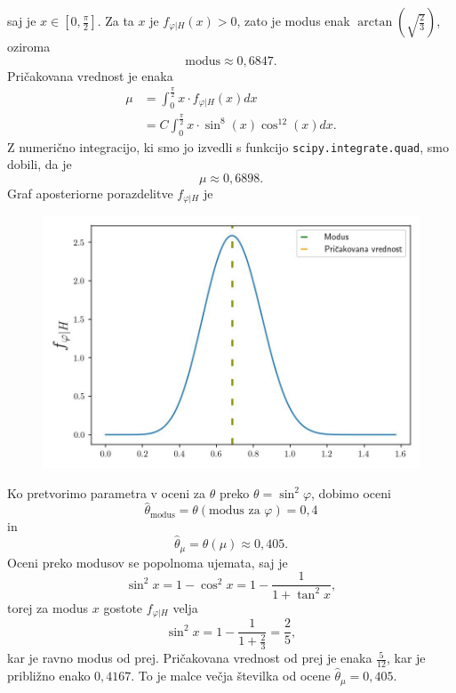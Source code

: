 \documentclass{article}
\begin{document}
saj je $x \in \left[0, \frac{\pi}{2}\right]$. Za ta $x$ je $f_{\varphi | H}(x) > 0$, zato je modus enak $\arctan(\sqrt{\frac{2}{3}})$, oziroma
\begin{equation*}
    \text{modus} \approx 0{,}6847.
\end{equation*}
Pričakovana vrednost je enaka
\begin{align*}
    \mu &= \int_0^{\frac{\pi}{2}}x \cdot f_{\varphi | H}(x) dx \\
    &= C \int_0^{\frac{\pi}{2}} x \cdot \sin^8 (x) \cos^{12}(x) dx.
\end{align*}
Z numerično integracijo, ki smo jo izvedli s funkcijo \texttt{scipy.integrate.quad}, smo dobili, da je 
\begin{equation*}
    \mu \approx 0{,}6898.
\end{equation*}
Graf aposteriorne porazdelitve $f_{\varphi | H}$ je
\begin{figure}[H]
    \centering
    \includegraphics[scale=0.7]{../rezultati/gostota_apos_2.jpg}
\end{figure}

Ko pretvorimo parametra v oceni za $\theta$ preko $\theta = \sin^2 \varphi$, dobimo oceni
\begin{equation*}
    \widehat{\theta}_{\text{modus}} = \theta(\text{modus za } \varphi) = 0{,}4
\end{equation*}
in
\begin{equation*}
    \widehat{\theta}_{\mu} = \theta(\mu) \approx 0{,}405.
\end{equation*}
Oceni preko modusov se popolnoma ujemata, saj je 
\begin{equation*}
    \sin^2 x = 1 - \cos^2x = 1 - \frac{1}{1 + \tan^2 x},
\end{equation*}
torej za modus $x$ gostote $f_{\varphi | H}$ velja 
\begin{equation*}
    \sin^2 x = 1 - \frac{1}{1 + \frac{2}{3}} = \frac{2}{5},
\end{equation*}
kar je ravno modus od prej. Pričakovana vrednost od prej je enaka $\frac{5}{12}$, kar je približno enako $0{,}4167$. To je malce večja številka od ocene $\widehat{\theta}_{\mu} = 0{,}405$.
\end{document}
